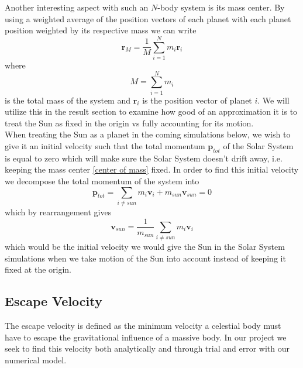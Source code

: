 \documentclass[12pt]{article}
\numberwithin{figure}{section}
\numberwithin{table}{section}
\begin{document}
\noindent Another interesting aspect with such an $N$-body system is its mass center. By using a weighted average of the position vectors of each planet with each planet position weighted by its respective mass we can write
\begin{equation}
		\mathbf{r}_M=\frac{1}{M}\sum_{i=1}^Nm_i\mathbf{r}_i\label{center of mass}        
\end{equation}
where
\begin{equation}
	M=\sum_{i=1}^Nm_i
\end{equation}
is the total mass of the system and $\mathbf{r}_i$ is the position vector of planet $i$. We will utilize this in the result section to examine how good of an approximation it is to treat the Sun as fixed in the origin vs fully accounting for its motion. \\

\noindent When treating the Sun as a planet in the coming simulations below, we wish to give it an initial velocity such that the total momentum $\mathbf{p}_{tot}$ of the Solar System is equal to zero which will make sure the Solar System doesn't drift away, i.e. keeping the mass center \eqref{center of mass} fixed. In order to find this initial velocity we decompose the total momentum of the system into
\begin{equation}
	\mathbf{p}_{tot}=\sum_{i\neq sun}m_i\mathbf{v}_i+m_{sun}\mathbf{v}_{sun}=0
\end{equation}
which by rearrangement gives
\begin{equation}
	\mathbf{v}_{sun}=\frac{1}{m_{sun}}\sum_{i\neq sun}m_i\mathbf{v}_i \label{eq:sun_init_v}
\end{equation}
which would be the initial velocity we would give the Sun in the Solar System simulations when we take  motion of the Sun into account instead of keeping it fixed at the origin.

\subsection{Escape Velocity}

\noindent The escape velocity is defined as the minimum velocity a celestial body must have to escape the gravitational influence of a massive body. In our project we seek to find this velocity both analytically and through trial and error with our numerical model. \\
\end{document}
